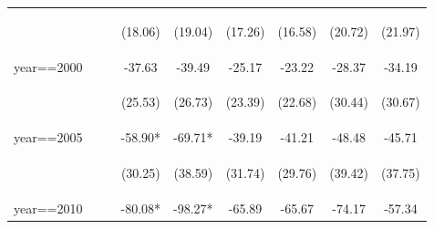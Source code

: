 \begin{landscape}
\begin{table}[htpb!]
\begin{center}
\begin{tabular}{lcccccccc}
&&&\begin{footnotesize}(18.06)\end{footnotesize}&\begin{footnotesize}(19.04)\end{footnotesize}&\begin{footnotesize}(17.26)\end{footnotesize}&\begin{footnotesize}(16.58)\end{footnotesize}&\begin{footnotesize}(20.72)\end{footnotesize}&\begin{footnotesize}(21.97)\end{footnotesize}\\
year==2000&&&-37.63&-39.49&-25.17&-23.22&-28.37&-34.19\\
&&&\begin{footnotesize}(25.53)\end{footnotesize}&\begin{footnotesize}(26.73)\end{footnotesize}&\begin{footnotesize}(23.39)\end{footnotesize}&\begin{footnotesize}(22.68)\end{footnotesize}&\begin{footnotesize}(30.44)\end{footnotesize}&\begin{footnotesize}(30.67)\end{footnotesize}\\
year==2005&&&-58.90*&-69.71*&-39.19&-41.21&-48.48&-45.71\\
&&&\begin{footnotesize}(30.25)\end{footnotesize}&\begin{footnotesize}(38.59)\end{footnotesize}&\begin{footnotesize}(31.74)\end{footnotesize}&\begin{footnotesize}(29.76)\end{footnotesize}&\begin{footnotesize}(39.42)\end{footnotesize}&\begin{footnotesize}(37.75)\end{footnotesize}\\
year==2010&&&-80.08*&-98.27*&-65.89&-65.67&-74.17&-57.34\\

\end{tabular}
\end{center}
\end{table}
\end{landscape}

